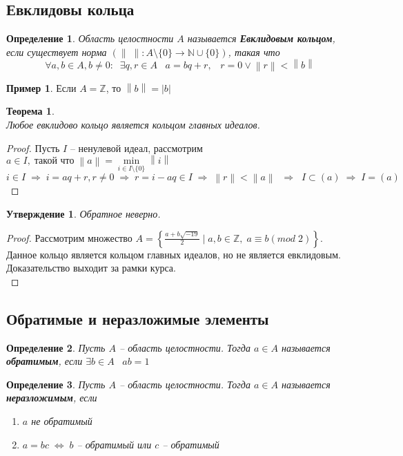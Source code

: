 \documentclass[12pt, a4paper]{article}
\newcommand{\nat}{\mathds{N}}
\newcommand{\lra}{\Leftrightarrow}
\newcommand{\ra}{\;\Rightarrow\;}
\newcommand{\Z}{\mathds{Z}}
\newcommand{\norm}[1]{\left \lVert #1 \right \rVert}
\theoremstyle{plain}
\newtheorem*{Th*}{Теорема}
\newtheorem{Def}{Определение}
\newtheorem*{Statement*}{Утверждение}
\theoremstyle{definition}
\newtheorem*{Example*}{Пример}
\begin{document}
\subsection*{Евклидовы кольца}
\begin{Def}
    Область целостности $A$ называется \textbf{Евклидовым кольцом}, если существует норма $(\norm{\;}:A\setminus \{0\}\to \nat\cup\{0\})$, такая что
\[\forall a,b \in A, b\neq 0: \;\; \exists q,r\in A\;\;\; a = bq+r, \;\;\; r = 0\vee \norm{r}<\norm{b}\]
\end{Def}
\begin{Example*}
    Если $A = \Z$, то $\norm{b} = |b|$
\end{Example*}
\begin{Th*}~\\
    Любое евклидово кольцо является кольцом главных идеалов.
\end{Th*}
\begin{proof}
    Пусть $I$ -- ненулевой идеал, рассмотрим $a \in I,\;\text{такой что}\; \norm{a} = \min\limits_{i\in I\setminus \{0\}}\norm{i}$\\
    $i\in I\ra i = aq+r, r\neq 0\ra r = i-aq\in I\ra\norm{r}<\norm{a}\; \ra \; I\subset (a)\ra I=(a)$\\
\end{proof}
\begin{Statement*}
    Обратное неверно.
\end{Statement*}
\begin{proof}
    Рассмотрим множество $A = \left\{\frac{a+b\sqrt{-19}}{2}\;|\; a,b\in \Z,\; a\equiv b(mod\; 2)\right\}$. Данное кольцо является кольцом главных идеалов, но не является евклидовым. Доказательство выходит за рамки курса.\\
\end{proof}
\subsection*{Обратимые и неразложимые элементы}
\begin{Def}
    Пусть $A$ -- область целостности. Тогда $a\in A$ называется \textbf{обратимым}, если $\exists b\in A\;\;\; ab=1$
\end{Def}
\begin{Def}
    Пусть $A$ -- область целостности. Тогда $a\in A$ называется \textbf{неразложимым}, если 
    \begin{enumerate}
        \item $a$ не обратимый
        \item $a = bc \;\lra\;b$ -- обратимый или $c$ -- обратимый
    \end{enumerate}
    
\end{Def}
\end{document}
